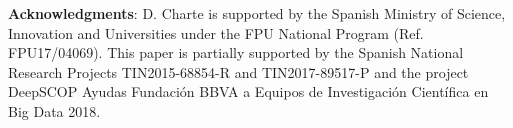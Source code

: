 \textbf{Acknowledgments}: D. Charte is supported by the Spanish Ministry of Science, Innovation and Universities under the FPU National Program (Ref. FPU17/04069). This paper is partially supported by the Spanish National Research Projects TIN2015-68854-R and TIN2017-89517-P and the project DeepSCOP Ayudas
Fundaci{\'o}n BBVA a Equipos de Investigaci{\'o}n Cient{\'i}fica en Big Data
2018.

%





